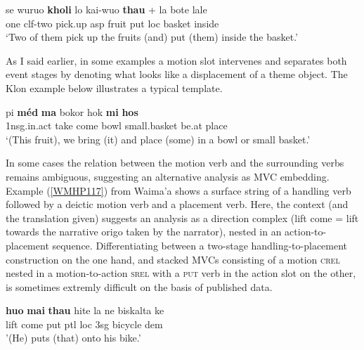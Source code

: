 \ea \label{WMHP058}
\gll se wuruo \textbf{kholi} lo kai-wuo \textbf{thau} + la bote lale \\
one \acs{clf}-two pick.up \acs{asp} fruit put \acs{loc} basket inside \\
\glft `Two of them pick up the fruits (and) put (them) inside the basket.' \\ 
\z
\xe

As I said earlier, in some examples a motion slot intervenes and separates both event stages by denoting what looks like a displacement of a theme object. The Klon example below illustrates a typical template.

\ea \label{}
\gll pi \textbf{méd} \textbf{ma} bokor hok \textbf{mi} \textbf{hos} \\
\acs{1}\acs{nsg}.\acs{in}.\acs{act} take come bowl small.basket be.at place \\
\glft `(This fruit), we bring (it) and place (some) in a bowl or small basket.' \\ 
\z
\xe

In some cases the relation between the motion verb and the surrounding verbs remains ambiguous, suggesting an alternative analysis as MVC embedding. Example (\ref{WMHP117}) from Waima'a shows a surface string of a handling verb followed by a deictic motion verb and a placement verb. Here, the context (and the translation given) suggests an analysis as a direction complex  (lift come = lift towards the narrative origo taken by the narrator), nested in an action-to-placement sequence. Differentiating between a two-stage handling-to-placement construction on the one hand, and stacked MVCs consisting of a motion \textsc{crel} nested in a motion-to-action \textsc{srel} with a \textsc{put} verb in the action slot on the other, is sometimes extremly difficult on the basis of published data.

\ea \label{WMHP117}
\gll \textbf{huo} \textbf{mai} \textbf{thau} hite la ne biskalta ke \\
lift come put \acs{ptl} \acs{loc} \acs{3}\acs{sg} bicycle \acs{dem} \\
\glft '(He) puts (that) onto his bike.' \\ 
\z
\xe

